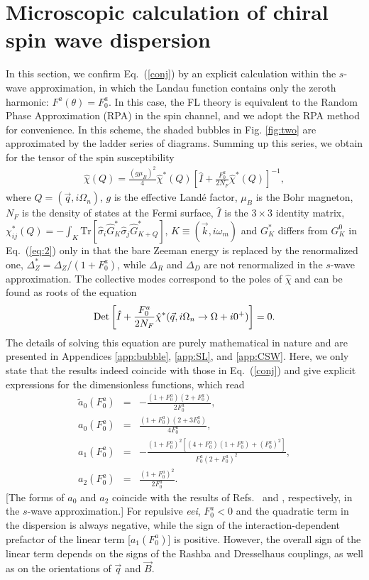 \documentclass[prb,aps,twocolumn]{revtex4}
\newcommand{\beq}{\begin{equation}}
\newcommand{\eeq}{\end{equation}}
\newcommand{\bea}{\begin{eqnarray}}
\newcommand{\eea}{\end{eqnarray}}
\newcommand{\bk}{{\vec k}}
\newcommand{\bq}{{\vec q}}
\newcommand{\bB}{{\vec B}}
\newcommand{\nn}{\nonumber}
\begin{document}
\section{Microscopic calculation of chiral spin wave
dispersion}\label{sec:micro} In this section, we confirm
Eq.~(\ref{conj}) by an explicit calculation within the $s$-wave
approximation, in which the Landau function contains only the
zeroth harmonic: $F^a(\theta)=F_0^a$. In this case, the FL theory
is equivalent to the Random Phase Approximation (RPA) in the spin
channel,\cite{SM1,SM_ESR} and we adopt the RPA method for
convenience. In this scheme, the shaded bubbles in Fig.
\ref{fig:two} are approximated by the ladder series of
diagrams.\cite{SM1,SM_ESR} Summing up this series, we obtain for
the tensor of the spin susceptibility \bea
\hat\chi(Q)=\frac{(g\mu_B)^2}{4} \hat\chi^*(Q)\left[\hat
I+\frac{F_0^a}{2N_F}\hat\chi^*(Q)\right]^{-1}, \eea where
$Q=(\bq,i\Omega_n)$, $g$ is the effective Land{\'e} factor,
$\mu_B$ is the Bohr magneton, $N_F$ is the density of states at
the Fermi surface, $\hat I$ is the $3\times 3$ identity matrix,
$\chi^*_{ij}(Q)=-\int_K\text{Tr}\left[\hat\sigma_i \hat G^*_K
\hat\sigma_j \hat G^*_{K+Q}\right]$, $K\equiv (\bk,i\omega_m)$ and
$G^*_K$  differs from $G^0_K$ in Eq.~(\ref{eq:2}) only in that the
bare Zeeman energy is replaced by the renormalized one,
$\Delta^*_Z=\Delta_Z/(1+F_0^a)$, while $\Delta_R$ and $\Delta_D$
are not renormalized in the $s$-wave approximation.
\cite{raikh:1999,saraga:2005,Shekhter} The collective modes
correspond to the poles of $\hat\chi$ and can be found as roots of
the equation \beq\label{eq:ins} {\rm Det}\left[\hat
I+\frac{F_0^a}{2N_F}\hat\chi^*(\bq,i\Omega_n\to \Omega+i
0^+)\right]=0. \eeq The details of solving this equation are
purely mathematical in nature and are presented in Appendices \ref{app:bubble}, \ref{app:SL}, and
\ref{app:CSW}. Here, we only state that the results indeed
coincide with those in Eq.~(\ref{conj}) and give explicit
expressions for the dimensionless functions, which read \bea
\tilde a_0(F_0^a)&=&-\frac{(1+F_0^a)(2+F_0^a)}{2F_0^a},\nn\\
a_0(F_0^a)&=&\frac{(1+F_0^a)(2+3F_0^a)}{4F_0^a},\nn\\
a_1(F_0^a)&=&-\frac{(1+F_0^a)^2\left[(4+F_0^a)(1+F_0^a)+(F_0^a)^2\right]}{F_0^a(2+F_0^a)^2},
\nn\\
a_2(F_0^a)&=&\frac{(1+F_0^a)^2}{2F_0^a}. \label{coeff} \eea [The
forms of $a_0$ and $a_2$  coincide with the results of
Refs.~ and , respectively,
in the $s$-wave approximation.] For repulsive {\em eei}, $F_0^a<0$
and the quadratic term in the dispersion is always negative, while
the sign of the interaction-dependent prefactor of the linear term
[$a_1(F^a_0)$] is positive. However, the overall sign of the
linear term depends on the signs of the Rashba and Dresselhaus
couplings, as well as on the orientations of $\bq$ and $\bB$.
\end{document}

